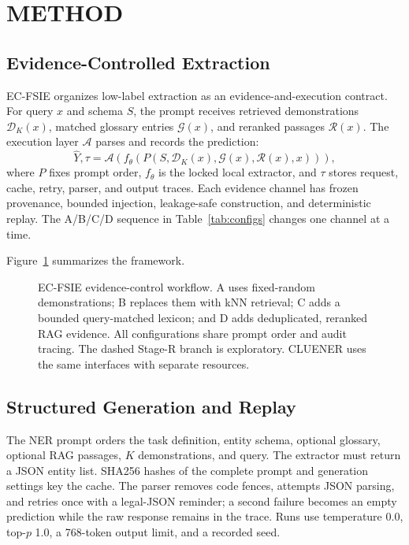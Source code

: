 \section{METHOD}

\subsection{Evidence-Controlled Extraction}

EC-FSIE organizes low-label extraction as an evidence-and-execution contract.
For query $x$ and schema $S$, the prompt receives retrieved demonstrations
$\mathcal{D}_K(x)$, matched glossary entries $\mathcal{G}(x)$, and reranked
passages $\mathcal{R}(x)$. The execution layer $\mathcal{A}$ parses and records
the prediction:
\[
\hat{Y},\tau = \mathcal{A}\!\left(f_{\theta}\!\left(
P\!\left(S,\mathcal{D}_K(x),\mathcal{G}(x),\mathcal{R}(x),x\right)
\right)\right),
\]
where $P$ fixes prompt order, $f_{\theta}$ is the locked local extractor, and
$\tau$ stores request, cache, retry, parser, and output traces. Each evidence
channel has frozen provenance, bounded injection, leakage-safe construction,
and deterministic replay. The A/B/C/D sequence in Table~\ref{tab:configs}
changes one channel at a time.

Figure~\ref{fig:ec-fsie-architecture} summarizes the framework.

\begin{figure}[t]
\centering

\caption{EC-FSIE evidence-control workflow. A uses fixed-random
demonstrations; B replaces them with kNN retrieval; C adds a bounded
query-matched lexicon; and D adds deduplicated, reranked RAG evidence. All
configurations share prompt order and audit tracing. The dashed Stage-R branch
is exploratory. CLUENER uses the same interfaces with separate resources.}
\label{fig:ec-fsie-architecture}
\end{figure}

\subsection{Structured Generation and Replay}

The NER prompt orders the task definition, entity schema, optional glossary,
optional RAG passages, $K$ demonstrations, and query. The extractor must return
a JSON entity list. SHA256 hashes of the complete prompt and generation
settings key the cache. The parser removes code fences, attempts JSON parsing,
and retries once with a legal-JSON reminder; a second failure becomes an empty
prediction while the raw response remains in the trace. Runs use temperature
0.0, top-$p$ 1.0, a 768-token output limit, and a recorded seed.

